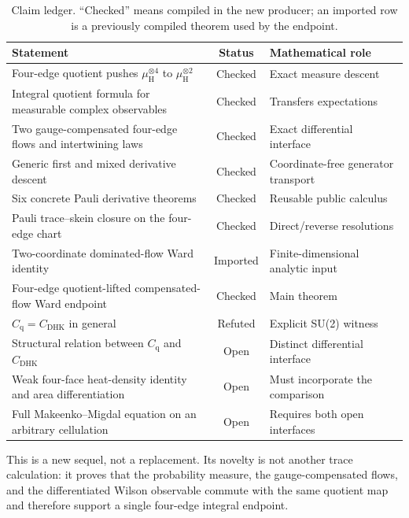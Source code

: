 \documentclass[11pt]{article}
\theoremstyle{definition}
\newcommand{\Haar}{\mu_{\mathrm H}}
\begin{document}
\begin{table}[ht]
\centering\small
\caption{Claim ledger. ``Checked'' means compiled in the new producer; an
imported row is a previously compiled theorem used by the endpoint.}
\label{tab:scope}
\begin{tabularx}{\textwidth}{@{}>{\raggedright\arraybackslash}X c
 >{\raggedright\arraybackslash}p{}@{}}
\toprule
Statement & Status & Mathematical role \\
\midrule
Four-edge quotient pushes $\Haar^{\otimes4}$ to $\Haar^{\otimes2}$
 & Checked & Exact measure descent \\
Integral quotient formula for measurable complex observables
 & Checked & Transfers expectations \\
Two gauge-compensated four-edge flows and intertwining laws
 & Checked & Exact differential interface \\
Generic first and mixed derivative descent
 & Checked & Coordinate-free generator transport \\
Six concrete Pauli derivative theorems
 & Checked & Reusable public calculus \\
Pauli trace--skein closure on the four-edge chart
 & Checked & Direct/reverse resolutions \\
Two-coordinate dominated-flow Ward identity
 & Imported & Finite-dimensional analytic input \\
Four-edge quotient-lifted compensated-flow Ward endpoint
 & Checked & Main theorem \\
$C_{\mathrm q}=C_{\mathrm{DHK}}$ in general
 & Refuted & Explicit SU(2) witness \\
Structural relation between $C_{\mathrm q}$ and $C_{\mathrm{DHK}}$
 & Open & Distinct differential interface \\
Weak four-face heat-density identity and area differentiation
 & Open & Must incorporate the comparison \\
Full Makeenko--Migdal equation on an arbitrary cellulation
 & Open & Requires both open interfaces \\
\bottomrule
\end{tabularx}
\end{table}

This is a new sequel, not a replacement.  Its novelty is not another trace
calculation: it proves that the probability measure, the gauge-compensated
flows, and the differentiated Wilson observable commute with the same
quotient map and therefore support a single four-edge integral endpoint.
\end{document}

